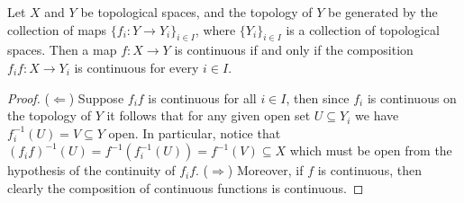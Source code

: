 \begin{proposition}
Let \(X\) and \(Y\) be topological spaces, and the topology of \(Y\) be
generated by the collection of maps \(\{f_i : Y \to Y_i\}_{i \in I}\), where
\(\{Y_i\}_{i \in I}\) is a collection of topological spaces. Then a map \(f :
X \to Y\) is continuous if and only if the composition \(f_i f : X \to
Y_i\) is continuous for every \(i \in I\).
\end{proposition}

\begin{proof}
(\(\Leftarrow\)) Suppose \(f_i f\) is continuous for all \(i \in I\),
then since \(f_i\) is continuous on the topology of \(Y\) it follows that for
any given open set \(U \subseteq Y_i\) we have \(f_i^{-1}(U) = V \subseteq Y\)
open. In particular, notice that \((f_i f)^{-1}(U) = f^{-1}(f_i^{-1}(U))
= f^{-1}(V) \subseteq X\) which must be open from the hypothesis of the
continuity of \(f_i f\). (\(\Rightarrow\)) Moreover, if \(f\) is
continuous, then clearly the composition of continuous functions is
continuous.
\end{proof}

